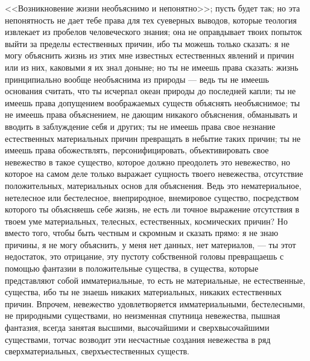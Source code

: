 \documentclass[12pt,oneside]{book}
\begin{document}
<<Возникновение жизни необъяснимо и непонятно>>; пусть будет так; но эта непонятность не дает тебе права для тех суеверных выводов, которые теология извлекает из пробелов человеческого знания; она не оправдывает твоих попыток выйти за пределы естественных причин, ибо ты можешь только сказать: я не могу объяснить жизнь из этих мне известных естественных явлений и причин или из них, каковыми я их знал доныне; но ты не имеешь права сказать: жизнь принципиально вообще необъяснима из природы --- ведь ты не имеешь основания считать, что ты исчерпал океан природы до последней капли; ты не имеешь права допущением воображаемых существ объяснять необъяснимое; ты не имеешь права объяснением, не дающим никакого объяснения, обманывать и вводить в заблуждение себя и других; ты не имеешь права свое незнание естественных материальных причин превращать в небытие таких причин; ты не имеешь права обожествлять, персонифицировать, объективировать свое невежество в такое существо, которое должно преодолеть это невежество, но которое на самом деле только выражает сущность твоего невежества, отсутствие положительных, материальных основ для объяснения. Ведь это нематериальное, нетелесное или бестелесное, внеприродное, внемировое существо, посредством которого ты объясняешь себе жизнь, не есть ли точное выражение отсутствия в твоем уме материальных, телесных, естественных, космических причин? Но вместо того, чтобы быть честным и скромным и сказать прямо: я не знаю причины, я не могу объяснить, у меня нет данных, нет материалов, --- ты этот недостаток, это отрицание, эту пустоту собственной головы превращаешь с помощью фантазии в положительные существа, в существа, которые представляют собой имматериальные, то есть не материальные, не естественные, существа, ибо ты не знаешь никаких материальных, никаких естественных причин. Впрочем, невежество удовлетворяется имматериальными, бестелесными, не природными существами, но неизменная спутница невежества, пышная фантазия, всегда занятая высшими, высочайшими и сверхвысочайшими существами, тотчас возводит эти несчастные создания невежества в ряд сверхматериальных, сверхъестественных существ.

\chapter{}
\end{document}
